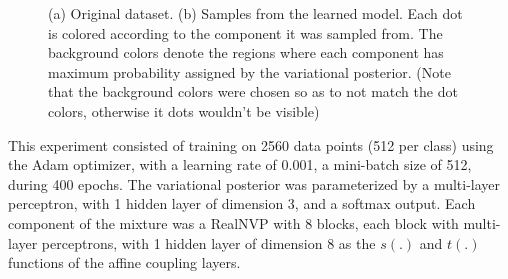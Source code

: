 \begin{figure}[!htb]
  \begin{subfigmatrix}{2}
  \end{subfigmatrix}
    \caption{(a) Original dataset. (b) Samples from the learned model. Each
dot is colored according to the component it was sampled from. The background
colors denote the regions where each component has maximum probability assigned
by the variational posterior. (Note that the background colors were chosen
so as to not match the dot colors, otherwise it dots wouldn't be visible)}
  \label{fig:pinwheel}
\end{figure}

This experiment consisted of training on 2560 data points (512 per class) using
the Adam optimizer, with a learning rate of 0.001, a
mini-batch size of 512, during 400 epochs. The variational posterior was parameterized
by a multi-layer perceptron, with 1 hidden layer of dimension 3, and a
softmax output. Each component of the mixture was a RealNVP with 8 blocks, each
block with multi-layer perceptrons, with 1 hidden layer of dimension 8 as the
$s(.)$ and $t(.)$ functions of the affine coupling layers.

